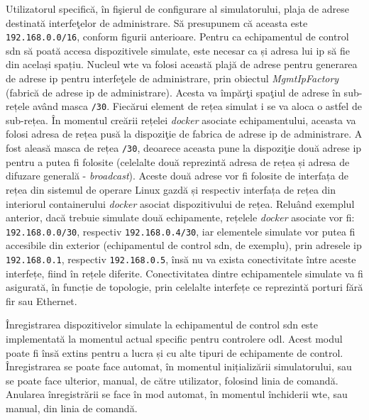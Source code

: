 Utilizatorul specifică, în fişierul de configurare al simulatorului, plaja de adrese destinată interfeţelor de administrare. Să presupunem că aceasta este \texttt{192.168.0.0/16}, conform figurii anterioare. Pentru ca echipamentul de control \gls{sdn} să poată accesa dispozitivele simulate, este necesar ca și adresa lui \gls{ip} să fie din același spațiu. Nucleul \gls{wte} va folosi această plajă de adrese pentru generarea de adrese \gls{ip} pentru interfeţele de administrare, prin obiectul \textit{MgmtIpFactory} (fabrică de adrese \gls{ip} de administrare). Acesta va împărţi spaţiul de adrese în sub-rețele având masca \texttt{/30}. Fiecărui element de rețea simulat i se va aloca o astfel de sub-rețea. În momentul creării rețelei \textit{docker} asociate echipamentului, aceasta va folosi adresa de rețea pusă la dispoziţie de fabrica de adrese \gls{ip} de administrare. A fost aleasă masca de rețea \texttt{/30}, deoarece aceasta pune la dispoziţie două adrese \gls{ip} pentru a putea fi folosite (celelalte două reprezintă adresa de rețea și adresa de difuzare generală - \textit{broadcast}). Aceste două adrese vor fi folosite de interfața de rețea din sistemul de operare Linux gazdă și respectiv interfața de rețea din interiorul containerului \textit{docker} asociat dispozitivului de rețea. Reluând exemplul anterior, dacă trebuie simulate două echipamente, rețelele \textit{docker} asociate vor fi: \texttt{192.168.0.0/30}, respectiv \texttt{192.168.0.4/30}, iar elementele simulate vor putea fi accesibile din exterior (echipamentul de control \gls{sdn}, de exemplu), prin adresele \gls{ip} \texttt{192.168.0.1}, respectiv \texttt{192.168.0.5}, însă nu va exista conectivitate între aceste interfețe, fiind în rețele diferite. Conectivitatea dintre echipamentele simulate va fi asigurată, în funcție de topologie, prin celelalte interfețe ce reprezintă porturi fără fir sau Ethernet.

Înregistrarea dispozitivelor simulate la echipamentul de control \gls{sdn} este implementată la momentul actual specific pentru controlere \gls{odl}. Acest modul poate fi însă extins pentru a lucra și cu alte tipuri de echipamente de control. Înregistrarea se poate face automat, în momentul inițializării simulatorului, sau se poate face ulterior, manual, de către utilizator, folosind linia de comandă. Anularea înregistrării se face în mod automat, în momentul închiderii \gls{wte}, sau manual, din linia de comandă.